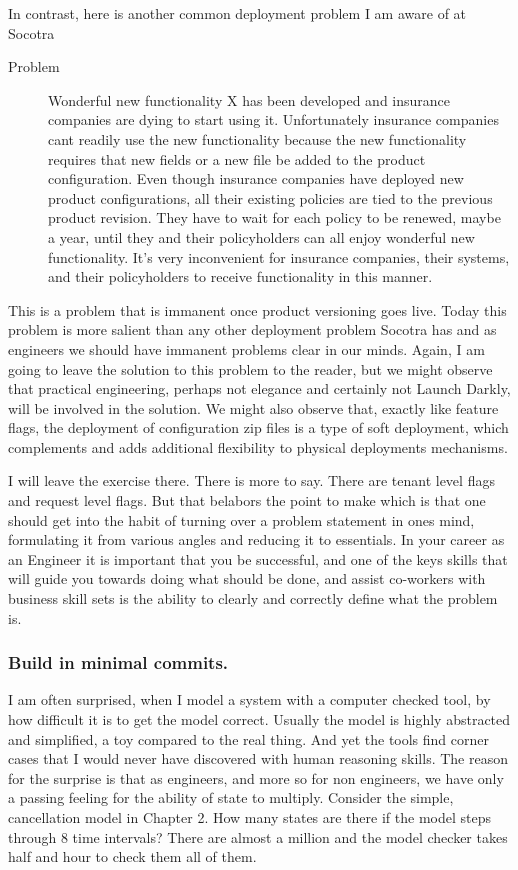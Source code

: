 In contrast, here is another common deployment problem I am aware of at Socotra
\begin{description}
  \item[Problem] Wonderful new functionality X has been developed and insurance companies are dying to start using it. Unfortunately insurance companies
  cant readily use the new functionality because the new functionality requires that new fields or a new file be added to the product configuration. Even
  though insurance companies have deployed new product configurations, all their existing policies are tied to the previous product revision. They have to wait for each
  policy to be renewed, maybe a year, until they and their policyholders can all enjoy wonderful new functionality. It's very inconvenient for insurance
  companies, their systems, and their policyholders to receive functionality in this manner.
\end{description}
This is a problem that is immanent once product versioning goes live. Today this problem  is more salient than any other deployment problem Socotra
has and as engineers we should have immanent problems clear in our minds. Again, I am going to leave the solution to this problem to the reader,
but we might observe that practical engineering, perhaps not elegance and certainly not Launch Darkly, will be involved in the solution. We might also observe
that, exactly like feature flags, the deployment of configuration zip files is a type of soft deployment, which complements and adds additional
flexibility to physical deployments mechanisms.

I will leave the exercise there. There is more to say. There are tenant level flags and request level flags. But that belabors the point to make
which is that
one should get into the habit of turning over a problem statement in ones mind, formulating it from various angles and reducing it to
essentials. In your career as an Engineer it is important that you be successful, and one of the keys skills that will guide you towards doing what should
be done, and assist co-workers with business skill sets is the ability to clearly and correctly define what the problem is.


\subsubsection{Build in minimal commits.}
I am often surprised, when I model a system with a computer checked tool, by how difficult it is to get the model correct. Usually the model
is highly abstracted and simplified, a toy compared to the real thing. And yet the tools find corner cases that I would never have discovered with
human reasoning skills. The reason for the surprise is that as engineers, and more so for non engineers, we have only a passing feeling for the
ability of state to multiply. Consider the simple, cancellation model in Chapter 2. How many states are there if the model steps through 8 time intervals?
There are almost a million and the model checker takes half and hour to check them all of them.

